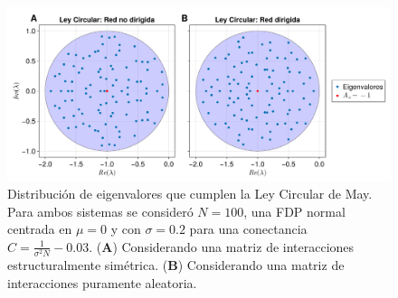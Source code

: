 \begin{figure}[h!]
	\centering
	\includegraphics[scale=0.2]{../Imagenes/LeyCircularMay}
	\caption{Distribución de eigenvalores que cumplen la Ley Circular de May. Para ambos sistemas se consideró $N=100$, una FDP normal centrada en $\mu=0$ y con $\sigma=0.2$ para una conectancia $C=\frac{1}{\sigma^2 N}-0.03$. (\textbf{A}) Considerando una matriz de interacciones estructuralmente simétrica. (\textbf{B}) Considerando una matriz de interacciones puramente aleatoria.}
	\label{fig:LeyCircularMay}
\end{figure}

